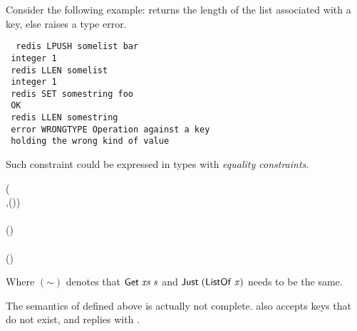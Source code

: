 Consider the following example:  returns the length of
 the list associated with a key, else raises a type error.

\begin{tabbing}\tt
~redis~LPUSH~somelist~bar\\
\tt ~integer~1\\
\tt ~redis~LLEN~somelist\\
\tt ~integer~1\\
\tt ~redis~SET~somestring~foo\\
\tt ~OK\\
\tt ~redis~LLEN~somestring\\
\tt ~error~WRONGTYPE~Operation~against~a~key\\
\tt ~holding~the~wrong~kind~of~value
\end{tabbing}

Such constraint could be expressed in types with
\emph{equality constraints}\cite{typeeq}.

\begin{hscode}\SaveRestoreHook
{}%
%
%
%
\>[B]{}\mathbin{::}(\;\<[E]%
\\
\>[B]{}\<[7]%
\>[7]{},\;\;\mathord{\sim}\;(\;)){}\<[E]%
\\
\>[B]{}\<[6]%
\>[6]{}\Rightarrow {}\;\<[E]%
\\
\>[B]{}\<[6]%
\>[6]{}\to {}\;\;\;(\;\;){}\<[E]%
\\
\>[B]{}\;\mathrel{=}{}\<[E]%
\\
\>[B]{}\<[6]%
\>[6]{}\mathbin{\$}\;(\;){}\<[E]%
\ColumnHook
\end{hscode}\resethooks

Where \ensuremath{(\mathord{\sim})} denotes that \ensuremath{\Conid{Get}\;\Varid{xs}\;\Varid{s}}
and \ensuremath{\Conid{Just}\;(\Conid{ListOf}\;\Varid{x})} needs to be the same.

The semantics of  defined above is actually not
complete.  also accepts keys that do not exist, and
 replies with .

